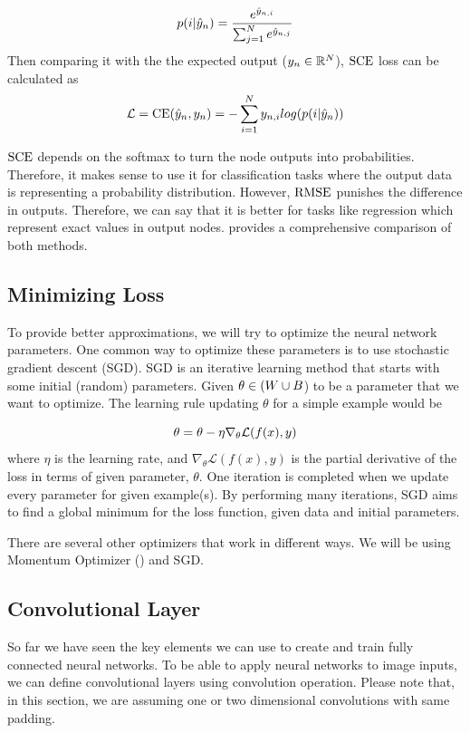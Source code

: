 $$p(i | \hat{y}_{n}) = \frac{e^{\hat{y}_{n,i}}}{\sum_{j=1}^{N}e^{\hat{y}_{n,j}}}$$
Then comparing it with the the expected output ($y_{n} \in \mathbb{R}^{N}$), $\textrm{SCE}$ loss can be calculated as
$$\mathcal{L} = \textrm{CE}(\hat{y}_{n}, y_{n}) = - \sum_{i=1}^{N} y_{n,i} log(p(i | \hat{y}_{n}))$$

$\textrm{SCE}$ depends on the softmax to turn the node outputs into probabilities. Therefore, it makes sense to use it for classification tasks where the output data is representing a probability distribution. However, $\textrm{RMSE}$ punishes the difference in outputs. Therefore, we can say that it is better for tasks like regression which represent exact values in output nodes. \cite{golik2013cross} provides a comprehensive comparison of both methods. 

\subsection{Minimizing Loss}
To provide better approximations, we will try to optimize the neural network parameters. One common way to optimize these parameters is to use stochastic gradient descent (SGD). SGD is an iterative learning method that starts with some initial (random) parameters. Given $\theta \in (\all\weights \cup \all\biasterm$) to be a parameter that we want to optimize. The learning rule updating $\theta$ for a simple example would be

$$ \theta = \theta- \eta \nabla_\theta{\mathcal{L}(f(x),y)} $$
where $\eta$ is the learning rate, and $\nabla_\theta{\mathcal{L}(f(x), y)}$ is the partial derivative of the loss in terms of given parameter, $\theta$. One iteration is completed when we update every parameter for given example(s). By performing many iterations, SGD aims to find a global minimum for the loss function, given data and initial parameters.

There are several other optimizers that work in different ways. We will be using Momentum Optimizer (\cite{qian1999momentum}) and SGD.

\subsection{Convolutional Layer}
So far we have seen the key elements we can use to create and train fully connected neural networks. To be able to apply neural networks to image inputs, we can define convolutional layers using convolution operation. Please note that, in this section, we are assuming one or two dimensional convolutions with same padding. 

